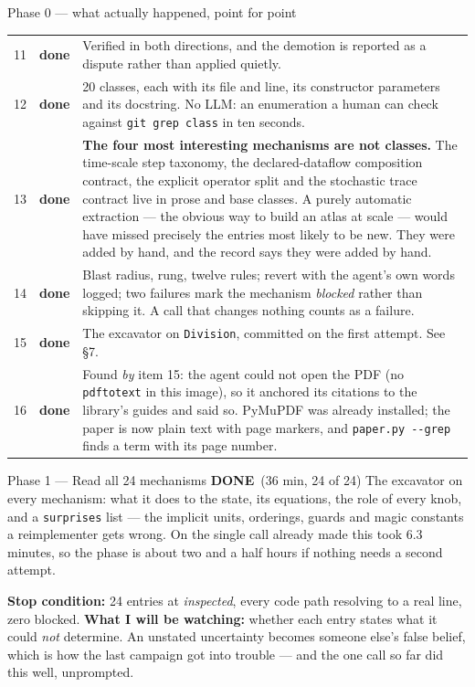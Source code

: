\documentclass[11pt,a4paper]{article}
\newcommand{\code}[1]{\texttt{#1}}
\newcommand{\dn}{\textcolor{good}{\textbf{done}}}
\newcommand{\done}{\textcolor{good}{\textbf{DONE}}}
\begin{document}
\begin{phasebox}{Phase 0 --- what actually happened, point for point}
\begin{tabular}{@{}r@{.\ } l p{9.1cm}@{}}
11 & \dn & Verified in both directions, and the demotion is reported as a dispute rather than
applied quietly.\\
12 & \dn & 20 classes, each with its file and line, its constructor parameters and its docstring.
No LLM: an enumeration a human can check against \code{git grep class} in ten seconds.\\
13 & \dn & \textbf{The four most interesting mechanisms are not classes.} The time-scale step
taxonomy, the declared-dataflow composition contract, the explicit operator split and the
stochastic trace contract live in prose and base classes. A purely automatic extraction --- the
obvious way to build an atlas at scale --- would have missed precisely the entries most likely to
be new. They were added by hand, and the record says they were added by hand.\\
14 & \dn & Blast radius, rung, twelve rules; revert with the agent's own words logged; two
failures mark the mechanism \emph{blocked} rather than skipping it. A call that changes nothing
counts as a failure.\\
15 & \dn & The excavator on \code{Division}, committed on the first attempt. See \S7.\\
16 & \dn & Found \emph{by} item 15: the agent could not open the PDF (no \code{pdftotext} in this
image), so it anchored its citations to the library's guides and said so. PyMuPDF was already
installed; the paper is now plain text with page markers, and \code{paper.py -{}-grep} finds a
term with its page number.\\
\bottomrule
\end{tabular}
\end{phasebox}

\begin{phasebox}{Phase 1 --- Read all 24 mechanisms \hfill \done\ (36 min, 24 of 24)}
The excavator on every mechanism: what it does to the state, its equations, the role of every knob,
and a \code{surprises} list --- the implicit units, orderings, guards and magic constants a
reimplementer gets wrong. On the single call already made this took 6.3 minutes, so the phase is
about two and a half hours if nothing needs a second attempt.

\textbf{Stop condition:} 24 entries at \emph{inspected}, every code path resolving to a real line,
zero blocked. \textbf{What I will be watching:} whether each entry states what it could
\emph{not} determine. An unstated uncertainty becomes someone else's false belief, which is how
the last campaign got into trouble --- and the one call so far did this well, unprompted.
\end{phasebox}
\end{document}
